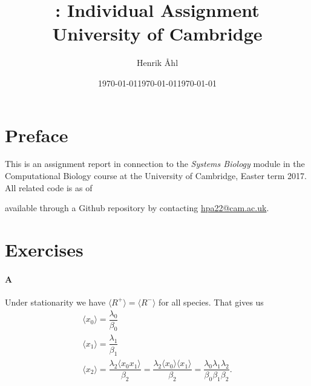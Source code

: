 \documentclass[10pt]{article}\usepackage[]{graphicx}\usepackage[]{color}
\title{
  \bf \course: Individual Assignment \\[1em]
  \small{University of Cambridge}
}
\author{Henrik Åhl}
\date{\today}
\theoremstyle{plain}
\newcommand{\course}{Systems Biology}
\newcommand{\term}{Easter term 2017}
\begin{document}
\date{\today}
\maketitle
\setcounter{page}{1}
\setcounter{section}{1}


\maketitle
	\section*{Preface}
	This is an assignment report in connection to the \textit{\course}
	module in the Computational Biology course at the University of Cambridge,
	\term. All related code is as of \date{\today} available through a
	Github repository by contacting \href{mailto:hpa22@cam.ac.uk}{hpa22@cam.ac.uk}.
	\section*{Exercises}
  \paragraph*{A}
    Under stationarity we have $\langle R^+ \rangle = \langle R^- \rangle$ for all species. That gives us
    \begin{gather*}
      \langle x_0 \rangle = \dfrac{\lambda_0}{\beta_0} \\
      \langle x_1 \rangle = \dfrac{\lambda_1}{\beta_1} \\
      \langle x_2 \rangle = \dfrac{\lambda_2\langle x_0x_1 \rangle}{\beta_2} = 
        \dfrac{\lambda_2\langle x_0\rangle\langle x_1 \rangle}{\beta_2} = 
        \dfrac{\lambda_0\lambda_1\lambda_2}{\beta_0\beta_1\beta_2}.
    \end{gather*}
    
\end{document}
